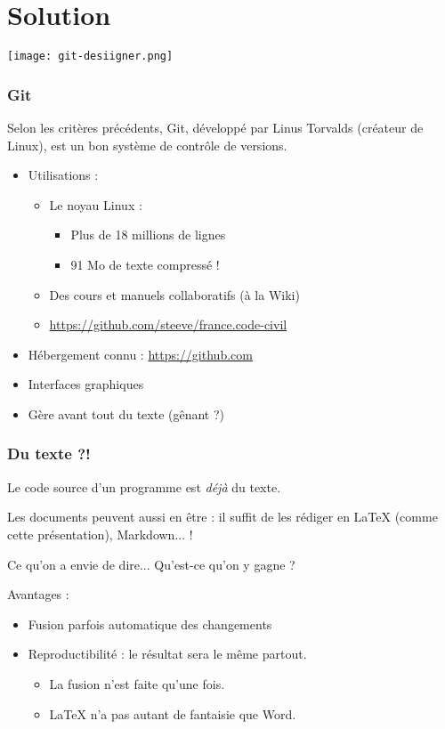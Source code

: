 \documentclass[compress]{beamer}
\newenvironment{envie}
	{\begin{block}{Ce qu'on a envie de dire...}}
	{\end{block}}
\begin{document}
\section{Solution}
\begin{frame}
	\center
	\texttt{[image: git-desiigner.png]}
\end{frame}
\begin{frame}
	\frametitle{Git}
	Selon les critères précédents, Git,
	développé par Linus Torvalds (créateur de Linux),
	est un bon système de contrôle de versions. %

	\begin{itemize}
		\item Utilisations : \pause
			\begin{itemize}
				\item Le noyau Linux :
					\begin{itemize}
						\item Plus de 18 millions de lignes
						\item 91 Mo de texte compressé ! \pause
					\end{itemize}
				\item Des cours et manuels collaboratifs (à la Wiki) \pause
				\item \url{https://github.com/steeve/france.code-civil} \pause
			\end{itemize}
		\item Hébergement connu : \url{https://github.com} \pause
		\item Interfaces graphiques \pause
		\item Gère avant tout du texte (gênant ?)
	\end{itemize}
\end{frame}

\begin{frame}
	\frametitle{Du texte ?!}
	Le code source d'un programme est \emph{déjà} du texte.
	\pause

	Les documents peuvent aussi en être : il suffit de les rédiger en
	\LaTeX{} (comme cette présentation), Markdown... !
	\pause

	\begin{envie}
		Qu'est-ce qu'on y gagne ? \pause
	\end{envie}

	Avantages :
	\begin{itemize}
		\item Fusion parfois automatique des changements \pause
		\item Reproductibilité : le résultat sera le même partout. \pause
			\begin{itemize}
				\item La fusion n'est faite qu'une fois. \pause
				\item \LaTeX{} n'a pas autant de fantaisie que Word.
			\end{itemize}
	\end{itemize}
\end{frame}
\end{document}
